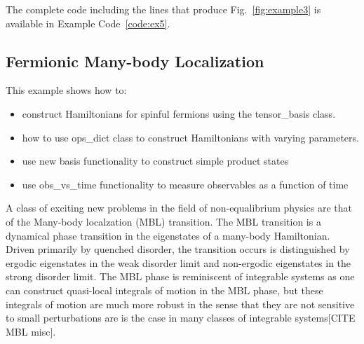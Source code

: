 \documentclass{SciPost}
\newcommand\0{\scalebox{-1}[1]{0}}
\begin{document}
The complete code including the lines that produce Fig.~\ref{fig:example3} is available in Example Code~\ref{code:ex5}.







\subsection{Fermionic Many-body Localization}
\label{subsec:Fermion_MBL}

This example shows how to:
\begin{itemize}
	\item construct Hamiltonians for spinful fermions using the tensor\_basis class.
	\item how to use ops\_dict class to construct Hamiltonians with varying parameters.
	\item use new basis functionality to construct simple product states
	\item use obs\_vs\_time functionality to measure observables as a function of time
\end{itemize}

A class of exciting new problems in the field of non-equalibrium physics are that of the Many-body localzation (MBL) transition. The MBL transition is a dynamical phase transition in the eigenstates of a many-body Hamiltonian. Driven primarily by quenched disorder, the transition occurs is distinguished by ergodic eigenstates in the weak disorder limit and non-ergodic eigenstates in the strong disorder limit. The MBL phase is reminiscent of integrable systems as one can construct quasi-local integrals of motion in the MBL phase, but these integrals of motion are much more robust in the sense that they are not sensitive to small perturbations are is the case in many classes of integrable systems[CITE MBL misc].
\end{document}
